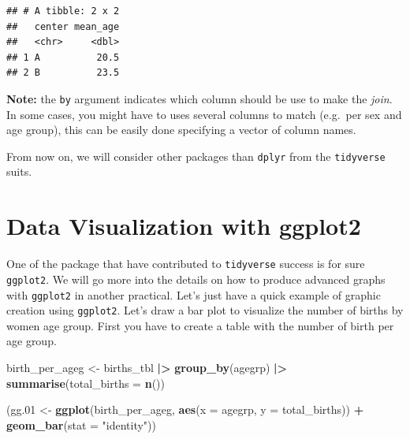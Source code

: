 \documentclass[
]{book}
\newenvironment{Shaded}{\begin{snugshade}}{\end{snugshade}}
\newcommand{\AttributeTok}[1]{\textcolor[rgb]{0.13,0.29,0.53}{#1}}
\newcommand{\FloatTok}[1]{\textcolor[rgb]{0.00,0.00,0.81}{#1}}
\newcommand{\FunctionTok}[1]{\textcolor[rgb]{0.13,0.29,0.53}{\textbf{#1}}}
\newcommand{\NormalTok}[1]{#1}
\newcommand{\OtherTok}[1]{\textcolor[rgb]{0.56,0.35,0.01}{#1}}
\newcommand{\SpecialCharTok}[1]{\textcolor[rgb]{0.81,0.36,0.00}{\textbf{#1}}}
\newcommand{\StringTok}[1]{\textcolor[rgb]{0.31,0.60,0.02}{#1}}
\begin{document}
\begin{verbatim}
## # A tibble: 2 x 2
##   center mean_age
##   <chr>     <dbl>
## 1 A          20.5
## 2 B          23.5
\end{verbatim}

\textbf{Note:} the \texttt{by} argument indicates which column should be use to make the \emph{join}. In some
cases, you might have to uses several columns to match (e.g.~per sex and age group), this
can be easily done specifying a vector of column names.

From now on, we will consider other packages than \texttt{dplyr} from the \texttt{tidyverse} suits.

\section{Data Visualization with ggplot2}\label{data-visualization-with-ggplot2}

One of the package that have contributed to \texttt{tidyverse} success is for sure \texttt{ggplot2}.
We will go more into the details on how to produce advanced graphs with \texttt{ggplot2} in another practical.
Let's just have a quick example of graphic creation using \texttt{ggplot2}.
Let's draw a bar plot to visualize the number of births by women age group.
First you have to create a table with the number of birth per age group.

\begin{Shaded}
\begin{Highlighting}[]
\NormalTok{birth\_per\_ageg }\OtherTok{\textless{}{-}}\NormalTok{ births\_tbl }\SpecialCharTok{|\textgreater{}}
  \FunctionTok{group\_by}\NormalTok{(agegrp) }\SpecialCharTok{|\textgreater{}}
  \FunctionTok{summarise}\NormalTok{(}\AttributeTok{total\_births =} \FunctionTok{n}\NormalTok{())}
\end{Highlighting}
\end{Shaded}

\begin{Shaded}
\begin{Highlighting}[]
\NormalTok{(gg}\FloatTok{.01} \OtherTok{\textless{}{-}}
  \FunctionTok{ggplot}\NormalTok{(birth\_per\_ageg, }\FunctionTok{aes}\NormalTok{(}\AttributeTok{x =}\NormalTok{ agegrp, }\AttributeTok{y =}\NormalTok{ total\_births)) }\SpecialCharTok{+}
  \FunctionTok{geom\_bar}\NormalTok{(}\AttributeTok{stat =} \StringTok{"identity"}\NormalTok{))}
\end{Highlighting}
\end{Shaded}
\end{document}
